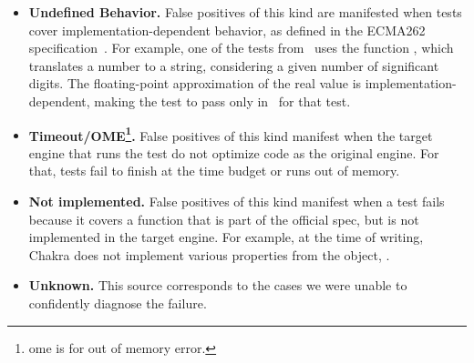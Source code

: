 \documentclass[10pt,conference,anonymous]{IEEEtran}
\begin{document}
\begin{itemize}
  \item \textbf{Undefined Behavior.} False positives of this kind are
    manifested when tests cover implementation-dependent behavior, as
    defined in the ECMA262 specification~\cite{ecmas262-spec}. For
    example, one of the tests from \jerry\ uses the function
    , which translates a
    number to a string, considering a given number of significant
    digits. The floating-point approximation of the real value is
    implementation-dependent, making the test to pass only in
    \chakra\ for that test. 

  \item \textbf{Timeout/OME\footnote{ome is for out of memory
      error.}.} False positives of this kind manifest when the target
    engine that runs the test do not optimize code as the original
    engine. For that, tests fail to finish at the time budget or runs
    out of memory.

  \item \textbf{Not implemented.} False positives of this kind
    manifest when a test fails because it covers a function that is
    part of the official spec, but is not implemented in the target
    engine. For example, at the time of writing, Chakra does not
    implement various properties from the  object, 
    .

  \item \textbf{Unknown.} This source corresponds to the cases we were
    unable to confidently diagnose the failure.


\end{itemize}
\end{document}
